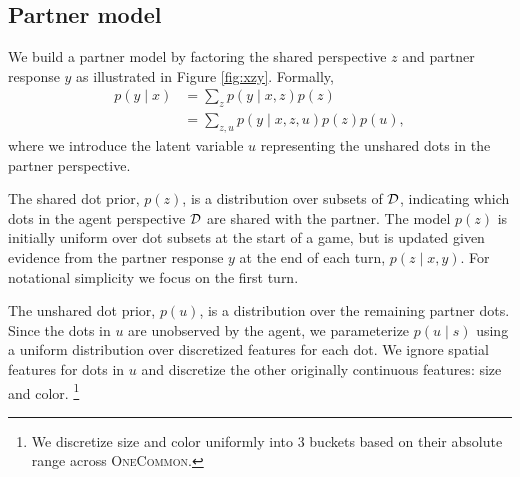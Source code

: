 \documentclass[11pt]{article}
\newcommand{\justin}[1]{{{\textcolor{purple}{(Justin: #1)}}}}
\begin{document}
\subsection{Partner model}


We build a partner model by factoring the shared perspective $z$ and partner response $y$ as illustrated in Figure \ref{fig:xzy}. 
Formally,
\begin{align*}
p(y \mid x) &= \sum_z p(y\mid x,z)p(z) \\
&= \sum_{z,u}  p(y \mid x, z, u)p(z)p(u),
\end{align*}
where we introduce the latent variable $u$ representing the unshared dots in the partner perspective.

The shared dot prior, $p(z)$, is a distribution over subsets of $\mathcal{D}$, indicating which dots in the agent perspective $\mathcal{D}$ are shared with the partner.
The model $p(z)$ is initially uniform over dot subsets at the start of a game,
but is updated given evidence from the partner response $y$ at the end of each turn, $p(z \mid x, y)$. For notational simplicity we focus on the first turn.

The unshared dot prior, $p(u)$, is a distribution over the remaining partner dots.
Since the dots in $u$ are unobserved by the agent, we parameterize $p(u \mid s)$ using a uniform distribution over discretized features for each dot.
We ignore spatial features for dots in $u$
and discretize the other originally continuous features: size and color.%
\footnote{
We discretize size and color uniformly into 3 buckets based on their absolute range
across \textsc{OneCommon}.
}


\end{document}
